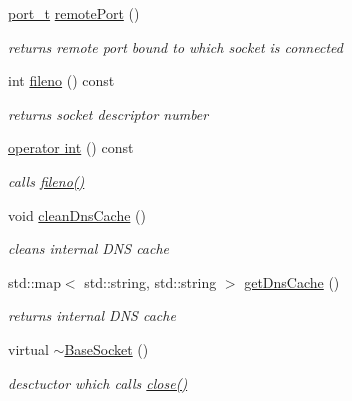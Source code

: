 \begin{CompactItemize}
\hyperlink{namespacesocketpp_5517ef80f249b891a2ba64b95fc1e723}{port\_\-t} \hyperlink{classsocketpp_1_1BaseSocket_039db642444d2111f2f58ebe032c5f5f}{remotePort} ()
\begin{CompactList}\small\item\em returns remote port bound to which socket is connected \item\end{CompactList}\item 
int \hyperlink{classsocketpp_1_1BaseSocket_c96db07cc917926d895d89cf73734ea1}{fileno} () const 
\begin{CompactList}\small\item\em returns socket descriptor number \item\end{CompactList}\item 
\hyperlink{classsocketpp_1_1BaseSocket_fa397f810462fe61238dbbf2d9c42c90}{operator int} () const 
\begin{CompactList}\small\item\em calls \hyperlink{classsocketpp_1_1BaseSocket_c96db07cc917926d895d89cf73734ea1}{fileno()} \item\end{CompactList}\item 
void \hyperlink{classsocketpp_1_1BaseSocket_f3a4c01a7bf911460296a873ce0913da}{cleanDnsCache} ()
\begin{CompactList}\small\item\em cleans internal DNS cache \item\end{CompactList}\item 
std::map$<$ std::string, std::string $>$ \hyperlink{classsocketpp_1_1BaseSocket_52bf8df48bf4da48eff4adc690caa211}{getDnsCache} ()
\begin{CompactList}\small\item\em returns internal DNS cache \item\end{CompactList}\item 
virtual \hyperlink{classsocketpp_1_1BaseSocket_2e066addfaa6f5648e68b3e6b0a15e79}{$\sim$BaseSocket} ()
\begin{CompactList}\small\item\em desctuctor which calls \hyperlink{classsocketpp_1_1BaseSocket_f067195056bb6b5a65c4bc1d2ac7da72}{close()} \item\end{CompactList}\end{CompactItemize}
